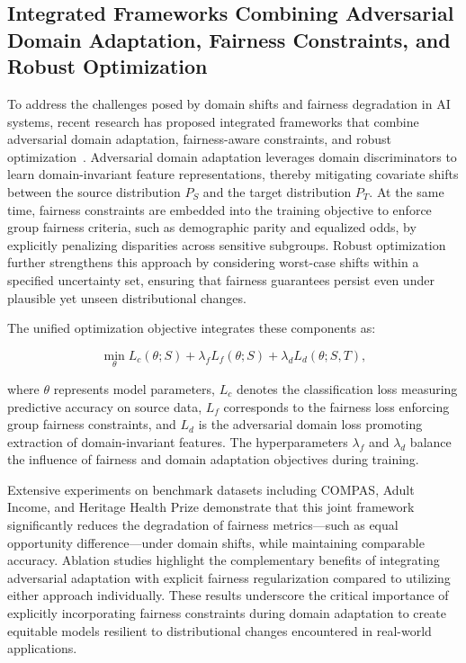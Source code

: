 \documentclass[sigconf]{acmart}
\begin{document}
\subsection{Integrated Frameworks Combining Adversarial Domain Adaptation, Fairness Constraints, and Robust Optimization}

To address the challenges posed by domain shifts and fairness degradation in AI systems, recent research has proposed integrated frameworks that combine adversarial domain adaptation, fairness-aware constraints, and robust optimization~\cite{ref26}. Adversarial domain adaptation leverages domain discriminators to learn domain-invariant feature representations, thereby mitigating covariate shifts between the source distribution \(P_S\) and the target distribution \(P_T\). At the same time, fairness constraints are embedded into the training objective to enforce group fairness criteria, such as demographic parity and equalized odds, by explicitly penalizing disparities across sensitive subgroups. Robust optimization further strengthens this approach by considering worst-case shifts within a specified uncertainty set, ensuring that fairness guarantees persist even under plausible yet unseen distributional changes.

The unified optimization objective integrates these components as:

\[
\min_{\theta} L_c(\theta; S) + \lambda_f L_f(\theta; S) + \lambda_d L_d(\theta; S, T),
\]

where \(\theta\) represents model parameters, \(L_c\) denotes the classification loss measuring predictive accuracy on source data, \(L_f\) corresponds to the fairness loss enforcing group fairness constraints, and \(L_d\) is the adversarial domain loss promoting extraction of domain-invariant features. The hyperparameters \(\lambda_f\) and \(\lambda_d\) balance the influence of fairness and domain adaptation objectives during training.

Extensive experiments on benchmark datasets including COMPAS, Adult Income, and Heritage Health Prize demonstrate that this joint framework significantly reduces the degradation of fairness metrics—such as equal opportunity difference—under domain shifts, while maintaining comparable accuracy. Ablation studies highlight the complementary benefits of integrating adversarial adaptation with explicit fairness regularization compared to utilizing either approach individually. These results underscore the critical importance of explicitly incorporating fairness constraints during domain adaptation to create equitable models resilient to distributional changes encountered in real-world applications.
\end{document}
